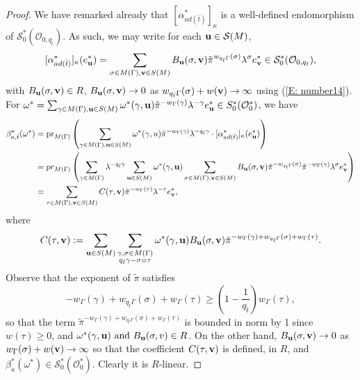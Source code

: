 \documentclass{article}
\theoremstyle{remark}
\def\c #1{ {\mathcal #1} }
\def\b #1{ {\bf #1} }
\begin{document}
\begin{proof}
We have remarked already that $[\alpha_{a d(\bar t)}^*]_\kappa$ is a well-defined endomorphism of $\c S_0^*(\c O_{0, q_{\bar t}})$. As such, we may write for each $\b u \in \c S(M)$,
\[
[ \alpha_{a d(\bar t)}^* ]_\kappa( e_{\b u}^*) = \sum_{\sigma \in M(\Gamma), \b v \in S(M)} B_{\b u}(\sigma, \b v) \tilde \pi^{w_{q_{\bar t}\Gamma}(\sigma)} \lambda^\sigma e_{\b v}^* \in \c S_0^*(\c O_{0, q_{\bar t}}),
\]
with $B_{\b u}(\sigma, \b v) \in R$, $B_{\b u}(\sigma, \b v) \rightarrow 0$ as $w_{q_{\bar t}\Gamma}(\sigma) + w(\b v) \rightarrow \infty$ using (\ref{E: number14}). For $\omega^* = \sum_{\gamma \in M(\Gamma), \b u \in S(M)} \omega^*(\gamma, \b u) \tilde \pi^{-w_\Gamma(\gamma)} \lambda^{-\gamma} e_{\b u}^* \in S_0^*(\c O_0^*)$, we have 
\begin{align*}
\beta_{\kappa, \bar t}^*(\omega^*) &= \text{pr}_{M(\Gamma)}\left( \sum_{\gamma \in M(\Gamma), \b u \in S(M)} \omega^*(\gamma, u) \tilde{\pi}^{-w_{\Gamma}(\gamma)}\lambda^{- q_{\bar t} \gamma} \cdot [\alpha_{a d(\bar t)}^*]_\kappa (e_{\b u}^*) \right) \\
&= pr_{M(\Gamma)} \left( \sum_{\gamma \in M(\Gamma)} \lambda^{- q_{\bar t} \gamma} \sum_{ \b u \in S(M)} \omega^*(\gamma, \b u) \sum_{\sigma \in M(\Gamma), \b v \in S(M)} B_{\b u}(\sigma, \b v) \tilde \pi^{-w_{q_{\bar t} \Gamma}(\sigma)} \tilde{\pi}^{-w_{\Gamma}(\gamma)} \lambda^\sigma e_{\b v}^* \right) \\
&= \sum_{\tau \in M(\Gamma), \b v \in S(M)} C(\tau, \b v) \tilde \pi^{-w_\Gamma(\tau)} \lambda^{-\tau} e_{\b v}^*,
\end{align*}
where
\[
C(\tau, \b v) := \sum_{\b u \in S(M)} \sum_{\substack{\gamma, \sigma \in M(\Gamma) \\ q_{\bar t} \gamma - \sigma = \tau}} \omega^*(\gamma, \b u) B_{\b u}(\sigma, \b v) \tilde \pi^{-w_\Gamma(\gamma) + w_{q_{\bar t}\Gamma}(\sigma) + w_\Gamma(\tau)}.
\]
Observe that the exponent of $\tilde \pi$ satisfies
\[
-w_\Gamma(\gamma) + w_{q_{\bar t}\Gamma}(\sigma) + w_\Gamma(\tau) \geq \left( 1 - \frac{1}{q_{\bar t}} \right) w_\Gamma(\tau),
\]
so that the term $\tilde \pi^{- w_\Gamma(\gamma) + w_{q_{\bar t} \Gamma}(\sigma) + w_\Gamma(\tau)}$ is bounded in norm by 1 since $w(\tau) \geq 0$, and  $\omega^*(\gamma, \b u) \ \text{and} \  B_{\b u}(\sigma,v) \in R$. On the other hand, $B_{\b u}(\sigma, \b v) \rightarrow 0$ as $w_\Gamma(\sigma) + w(\b v) \rightarrow \infty$ so that the coefficient $C(\tau, \b v)$ is defined, in $R$, and $\beta_\kappa^*( \omega^*) \in \c S_0^*(\c O_0^*)$. Clearly it is $R$-linear. 
\end{proof}
\end{document}
